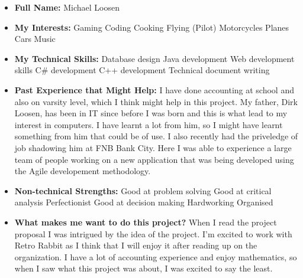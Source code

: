 \documentclass{article}
\begin{document}
	\begin{itemize}
		\item \textbf{Full Name:} Michael Loosen
		\item \textbf{My Interests:}
		\subitem Gaming
		\subitem Coding
		\subitem Cooking
		\subitem Flying (Pilot)
		\subitem Motorcycles
		\subitem Planes
		\subitem Cars
		\subitem Music
		
		\item \textbf{My Technical Skills:}
		\subitem Database design
		\subitem Java development
		\subitem Web development skills		
		\subitem C\# development
		\subitem C++ development
		\subitem Technical document writing
		
		\item \textbf{Past Experience that Might Help:} \newline
		I have done accounting at school and also on varsity level, which I think might help in this project. My father, Dirk Loosen, has been in IT since before I was born and this is what lead to my interest in computers. I have learnt a lot from him, so I might have learnt something from him that could be of use. I also recently had the priveledge of job shadowing him at FNB Bank City. Here I was able to experience a large team of people working on a new application that was being developed using the Agile developement methodology.
		
		\item \textbf{Non-technical Strengths:}
		\subitem Good at problem solving
		\subitem Good at critical analysis
		\subitem Perfectionist		
		\subitem Good at decision making
		\subitem Hardworking
		\subitem Organised
		
		\item \textbf{What makes me want to do this project?} \newline
		When I read the project proposal I was intrigued by the idea of the project. I'm excited to work with Retro Rabbit as I think that I will enjoy it after reading up on the organization. I have a lot of accounting experience and enjoy mathematics, so when I saw what this project was about, I was excited to say the least.
	\end{itemize}
			
\end{document}
